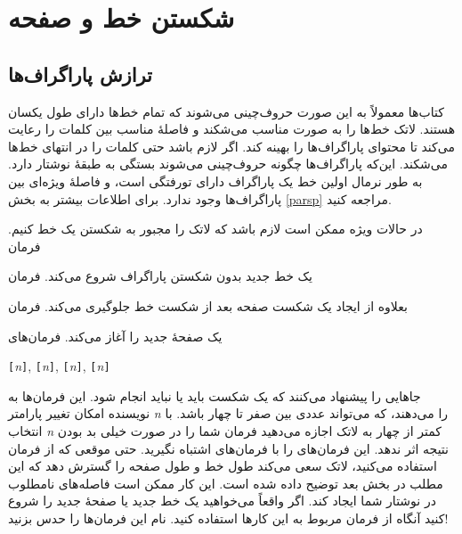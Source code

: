 \section{شکستن خط و صفحه}
\subsection{ترازش پاراگراف‌ها}
کتاب‌ها معمولاً به این صورت حروف‌چینی می‌شوند که تمام خط‌ها دارای طول یکسان هستند. لاتک خط‌ها را به صورت مناسب می‌شکند 
و فاصلهٔ مناسب بین کلمات را رعایت می‌کند تا محتوای پاراگراف‌ها را بهینه کند. اگر لازم باشد حتی کلمات را در انتهای خط‌ها می‌شکند. 
این‌که پاراگراف‌ها چگونه حروف‌چینی می‌شوند بستگی به طبقهٔ نوشتار دارد. به طور نرمال اولین خط یک پاراگراف دارای تورفتگی است، 
و فاصلهٔ ویژه‌ای بین پاراگراف‌ها وجود ندارد. برای اطلاعات بیشتر به بخش 
\ref{parsp}
مراجعه کنید.

در حالات ویژه ممکن است لازم باشد که لاتک را مجبور به شکستن یک خط کنیم. فرمان
\begin{lscommand}
\ci{\bs}   
\end{lscommand}
\noindent یک خط جدید بدون شکستن پاراگراف شروع می‌کند. فرمان

\begin{lscommand}
\ci{\bs*}
\end{lscommand}
\noindent بعلاوه از ایجاد یک شکست صفحه بعد از شکست خط جلوگیری می‌کند. فرمان

\begin{lscommand}
\end{lscommand}
\noindent یک صفحهٔ جدید را آغاز می‌کند.  فرمان‌های

\begin{lscommand}
\verb|[|\emph{n}\verb|]|,
\verb|[|\emph{n}\verb|]|, 
\verb|[|\emph{n}\verb|]|,
\verb|[|\emph{n}\verb|]|
\end{lscommand}
\noindent 
جاهایی را پیشنهاد می‌کنند که یک شکست باید یا نباید انجام شود. این فرمان‌ها به نویسنده امکان تغییر پارامتر \emph{n} را می‌دهند، 
که می‌تواند عددی بین صفر تا چهار باشد. با انتخاب \emph{n} کمتر از چهار به لاتک اجازه می‌دهید فرمان شما را در صورت خیلی بد بودن 
نتیجه اثر ندهد. این فرمان‌های  را با فرمان‌های  اشتباه نگیرید. حتی موقعی که از فرمان  
استفاده می‌کنید، لاتک سعی می‌کند طول خط و طول صفحه را گسترش دهد  که این مطلب در بخش بعد توضیح داده شده است. این کار ممکن است فاصله‌های 
نامطلوب در نوشتار شما ایجاد کند. اگر واقعاً می‌خواهید یک خط جدید یا صفحهٔ جدید را شروع کنید آنگاه از فرمان مربوط به این کارها 
استفاده کنید. نام این فرمان‌ها را حدس بزنید!

